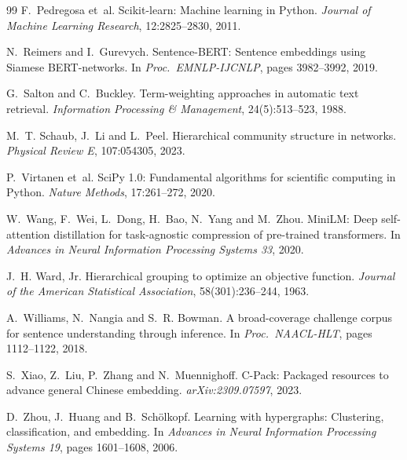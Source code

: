 \documentclass[11pt,a4paper]{article}
\theoremstyle{remark}
\begin{document}
\begin{thebibliography}{99}
F.~Pedregosa et~al.
\newblock Scikit-learn: Machine learning in Python.
\newblock \emph{Journal of Machine Learning Research}, 12:2825--2830, 2011.

N.~Reimers and I.~Gurevych.
\newblock Sentence-BERT: Sentence embeddings using Siamese BERT-networks.
\newblock In \emph{Proc.\ EMNLP-IJCNLP}, pages 3982--3992, 2019.

G.~Salton and C.~Buckley.
\newblock Term-weighting approaches in automatic text retrieval.
\newblock \emph{Information Processing \& Management}, 24(5):513--523, 1988.

M.~T. Schaub, J.~Li and L.~Peel.
\newblock Hierarchical community structure in networks.
\newblock \emph{Physical Review E}, 107:054305, 2023.

P.~Virtanen et~al.
\newblock SciPy 1.0: Fundamental algorithms for scientific computing in Python.
\newblock \emph{Nature Methods}, 17:261--272, 2020.

W.~Wang, F.~Wei, L.~Dong, H.~Bao, N.~Yang and M.~Zhou.
\newblock MiniLM: Deep self-attention distillation for task-agnostic compression of pre-trained
transformers.
\newblock In \emph{Advances in Neural Information Processing Systems 33}, 2020.

J.~H. Ward, Jr.
\newblock Hierarchical grouping to optimize an objective function.
\newblock \emph{Journal of the American Statistical Association}, 58(301):236--244, 1963.

A.~Williams, N.~Nangia and S.~R. Bowman.
\newblock A broad-coverage challenge corpus for sentence understanding through inference.
\newblock In \emph{Proc.\ NAACL-HLT}, pages 1112--1122, 2018.

S.~Xiao, Z.~Liu, P.~Zhang and N.~Muennighoff.
\newblock C-Pack: Packaged resources to advance general Chinese embedding.
\newblock \emph{arXiv:2309.07597}, 2023.

D.~Zhou, J.~Huang and B.~Sch\"olkopf.
\newblock Learning with hypergraphs: Clustering, classification, and embedding.
\newblock In \emph{Advances in Neural Information Processing Systems 19}, pages 1601--1608, 2006.

\end{thebibliography}
\end{document}
